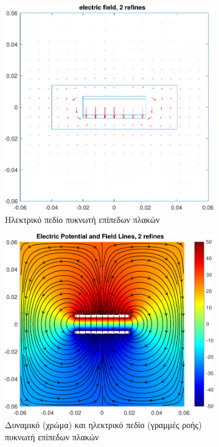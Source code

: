 \documentclass[10pt, letterpaper]{article}
\begin{document}
\begin{figure}[h!]
  \centering
  \begin{subfigure}[b]{0.44\textwidth}
      \centering
      \includegraphics[width=\textwidth]{capacitor_field_2.pdf}
      \caption{Ηλεκτρικό πεδίο πυκνωτή επίπεδων πλακών \vspace{\baselineskip}}
      \label{}
  \end{subfigure}
  \hfill
  \begin{subfigure}[b]{0.5\textwidth}
    \centering
    \includegraphics[width=\textwidth]{capacitor_field_streamlines_2.pdf}
    \caption{Δυναμικό (χρώμα) και ηλεκτρικό πεδίο (γραμμές ροής) πυκνωτή επίπεδων πλακών}
    \label{}
\end{subfigure}
  \caption{}
  \label{}
\end{figure}
\end{document}
